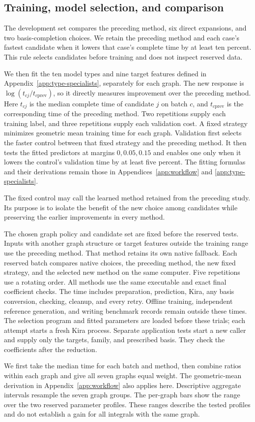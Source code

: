 \subsection{Training, model selection, and comparison}
The development set compares the preceding method, six direct expansions,
and two basis-completion choices. We retain the preceding method and each
case's fastest candidate when it lowers that case's complete time by at
least ten percent. This rule selects candidates before training and does
not inspect reserved data.

We then fit the ten model types and nine target features defined in
Appendix~\ref{app:type-specialists}, separately for each graph. The new
response is $\log(t_{cj}/t_{c\mathrm{prev}})$, so it directly measures
improvement over the preceding method. Here $t_{cj}$ is the median complete
time of candidate $j$ on batch $c$, and $t_{c\mathrm{prev}}$ is the
corresponding time of the preceding method. Two repetitions supply each
training label, and three repetitions supply each validation cost. A
fixed strategy minimizes geometric mean training time for each graph.
Validation first selects the faster control between that fixed strategy
and the preceding method. It then tests the fitted predictors at margins
$0,0.05,0.15$ and enables one only when it lowers the control's validation
time by at least five percent. The fitting formulas and their derivations
remain those in Appendices~\ref{app:workflow} and
\ref{app:type-specialists}.

The fixed control may call the learned method retained from the preceding study. Its purpose is to isolate the benefit of the new choice among candidates while preserving the earlier improvements in every method.

The chosen graph policy and candidate set are fixed before the reserved
tests. Inputs with another graph structure or target features outside the
training range use the preceding method. That method retains its own
native fallback. Each reserved batch compares native choices, the
preceding method, the new fixed strategy, and the selected new method on
the same computer. Five repetitions use a rotating order. All methods
use the same executable and exact final coefficient checks. The time
includes preparation, prediction, Kira, any basis conversion, checking,
cleanup, and every retry. Offline training, independent reference
generation, and writing benchmark records remain outside these times.
The selection program and fitted parameters are loaded
before these trials; each attempt starts a fresh Kira process. Separate
application tests start a new caller and supply only the targets, family,
and prescribed basis. They check the coefficients after the reduction.

We first take the median time for each batch and method, then combine
ratios within each graph and give all seven graphs equal weight. The
geometric-mean derivation in Appendix~\ref{app:workflow} also applies here.
Descriptive aggregate intervals resample the seven graph groups. The
per-graph bars show the range over the two reserved parameter profiles.
These ranges describe the tested profiles and do not establish a gain
for all integrals with the same graph.
